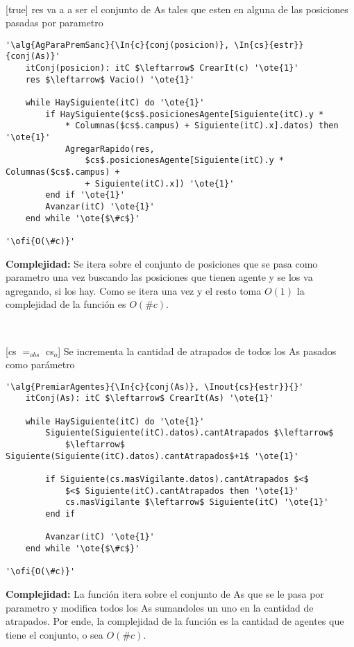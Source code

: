 ~


[true]
{res va a a ser el conjunto de As tales que esten en alguna de las posiciones pasadas por parametro}

\begin{lstlisting}[mathescape]
'\alg{AgParaPremSanc}{\In{c}{conj(posicion)}, \In{cs}{estr}}{conj(As)}'
	itConj(posicion): itC $\leftarrow$ CrearIt(c) '\ote{1}'
	res $\leftarrow$ Vacio() '\ote{1}'

	while HaySiguiente(itC) do '\ote{1}'
		if HaySiguiente($cs$.posicionesAgente[Siguiente(itC).y *
			* Columnas($cs$.campus) + Siguiente(itC).x].datos) then '\ote{1}'
			AgregarRapido(res,
				$cs$.posicionesAgente[Siguiente(itC).y * Columnas($cs$.campus) +
				+ Siguiente(itC).x]) '\ote{1}'
		end if '\ote{1}'
		Avanzar(itC) '\ote{1}'
	end while '\ote{$\#c$}'

'\ofi{O(\#c)}'
\end{lstlisting}

\textbf{Complejidad:} Se itera sobre el conjunto de posiciones que se pasa como parametro una vez buscando las posiciones que tienen agente y se los va agregando, si los hay. Como se itera una vez y el resto toma $O(1)$ la complejidad de la función es $O(\#c)$.

~


[cs $=_{obs}$ cs$_o$]
{Se incrementa la cantidad de atrapados de todos los As pasados como parámetro}

\begin{lstlisting}[mathescape]
'\alg{PremiarAgentes}{\In{c}{conj(As)}, \Inout{cs}{estr}}{}'
	itConj(As): itC $\leftarrow$ CrearIt(As) '\ote{1}'

	while HaySiguiente(itC) do '\ote{1}'
		Siguiente(Siguiente(itC).datos).cantAtrapados $\leftarrow$
			$\leftarrow$ Siguiente(Siguiente(itC).datos).cantAtrapados$+1$ '\ote{1}'

		if Siguiente(cs.masVigilante.datos).cantAtrapados $<$
			$<$ Siguiente(itC).cantAtrapados then '\ote{1}'
			cs.masVigilante $\leftarrow$ Siguiente(itC) '\ote{1}'
		end if

		Avanzar(itC) '\ote{1}'
	end while '\ote{$\#c$}'

'\ofi{O(\#c)}'
\end{lstlisting}

\textbf{Complejidad:} La función itera sobre el conjunto de As que se le pasa por parametro y modifica todos los As sumandoles un uno en la cantidad de atrapados. Por ende, la complejidad de la función es la cantidad de agentes que tiene el conjunto, o sea $O(\#c)$.

